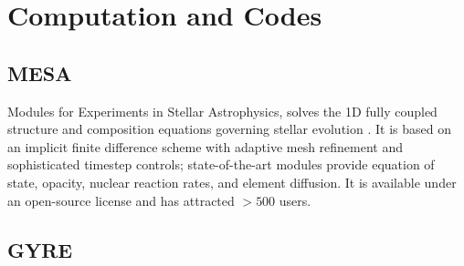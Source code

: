 \section{Computation and Codes}
    
    
{\color{green}    
\subsection{MESA}
Modules for Experiments in Stellar
Astrophysics, solves the 1D fully coupled structure and composition
equations governing stellar evolution \citep{paxton11,Paxton:2013}. It
is based on an implicit finite difference scheme with adaptive mesh
refinement and sophisticated timestep controls; 
state-of-the-art modules provide equation of state, opacity, nuclear
reaction rates, and element diffusion.
It is 
available under an open-source license and has  attracted $>500$ 
 users.




}    
    
    
{\color{brown}    
\subsection{GYRE}
    

}    